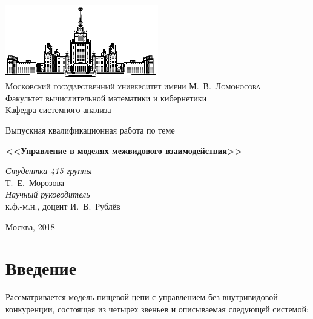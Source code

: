 \documentclass[11pt]{article}
\theoremstyle{definition}
\begin{document}
\thispagestyle{empty}

\begin{center}
\ \vspace{-3cm}

\includegraphics[width=0.5\textwidth]{msu.eps}\\
{\scshape Московский государственный университет имени М.~В.~Ломоносова}\\
Факультет вычислительной математики и кибернетики\\
Кафедра системного анализа

\vfill

{\LARGE Выпускная квалификационная работа по теме}

\vspace{1cm}

{\Huge\bfseries <<Управление в моделях межвидового взаимодействия>>}
\end{center}

\vspace{1cm}

\begin{flushright}
  \large
  \textit{Студентка 415 группы}\\
  Т.~Е.~Морозова\\
  \textit{Научный руководитель}\\
  к.ф.-м.н., доцент И.~В.~Рублёв 

  \vspace{5mm}

 \end{flushright}

\vfill

\begin{center}
Москва, 2018
\end{center}

\newpage
\tableofcontents
\newpage

\section{Введение}

Рассматривается модель пищевой цепи с управлением без внутривидовой конкуренции, состоящая из четырех звеньев и описываемая следующей системой:
\end{document}

